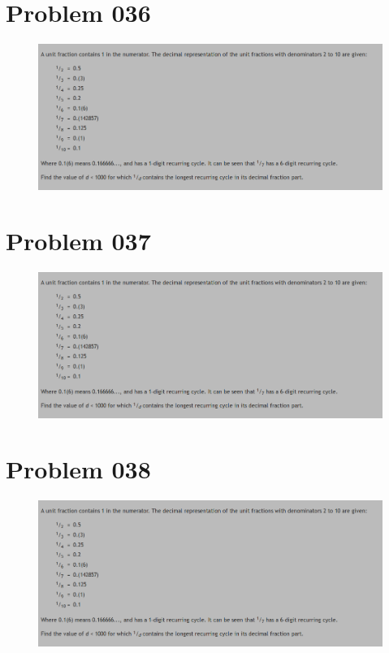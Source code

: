 \section{Problem 036}
\begin{prob}
	\begin{figure}[htb!]
		\begin{center}
			\includegraphics[scale = 0.4]{pic/026.png}
		\end{center}
	\end{figure}
\end{prob}
\section{Problem 037}
\begin{prob}
	\begin{figure}[htb!]
		\begin{center}
			\includegraphics[scale = 0.4]{pic/026.png}
		\end{center}
	\end{figure}
\end{prob}
\section{Problem 038}
\begin{prob}
	\begin{figure}[htb!]
		\begin{center}
			\includegraphics[scale = 0.4]{pic/026.png}
		\end{center}
	\end{figure}
\end{prob}
